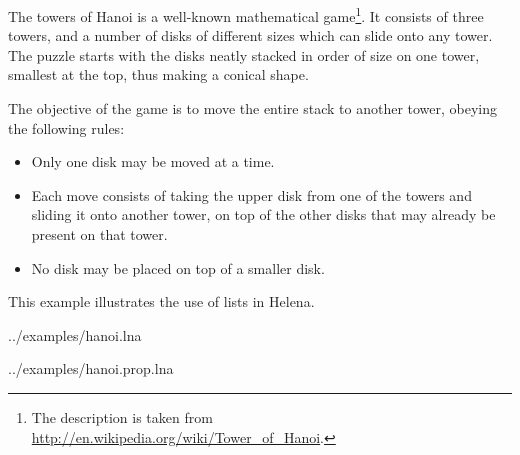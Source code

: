 The towers of Hanoi is a well-known mathematical game\footnote{The
  description is taken
  from \url{http://en.wikipedia.org/wiki/Tower_of_Hanoi}.}.  It
  consists of three towers, and a number of disks of different sizes
  which can slide onto any tower.  The puzzle starts with the disks
  neatly stacked in order of size on one tower, smallest at the top,
  thus making a conical shape.

The objective of the game is to move the entire stack to another
tower, obeying the following rules:
\begin{itemize}
\item Only one disk may be moved at a time.
\item Each move consists of taking the upper disk from one of the
  towers and sliding it onto another tower, on top of the other disks
  that may already be present on that tower.
\item No disk may be placed on top of a smaller disk.
\end{itemize}

This example illustrates the use of lists in Helena.

 {../examples/hanoi.lna}

 {../examples/hanoi.prop.lna}
